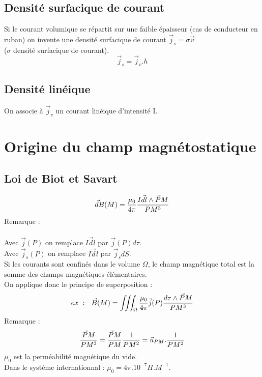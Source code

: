 \documentclass[11pt,a4paper,french]{article}
\begin{document}
\subsection{Densité surfacique de courant}
Si le courant volumique se répartit sur une faible épaisseur (cas de conducteur en ruban) on invente une densité surfacique de courant $\vec j_s = \sigma \vec v$ \\($\sigma$ densité surfacique de courant).
$$\vec j_s = \vec j_v .h$$
\subsection{Densité linéique}
On associe à $\vec j_v$ un courant linéique d'intensité I.
\newpage
\section{Origine du champ magnétostatique}
\subsection{Loi de Biot et Savart}
$$\vec dB(M) = {\mu_0 \over 4\pi}{I \vec dl \wedge \vec PM \over PM^3}$$
Remarque : \\ \\
Avec $\vec j(P)$ on remplace $I\vec dl$ par $\vec j(P)d\tau$.\\
Avec $\vec j_s(P)$ on remplace $I\vec dl$ par $\vec j_sdS$. \\
Si les courants sont confinés dans le volume $\Omega$, le champ magnétique total est la somme des champs magnétiques élémentaires.\\
On applique donc le principe de superposition : 
$$ex~:~~\vec B(M) = \iiint_\Omega {\mu_0 \over 4\pi}\vec j(P){d\tau \wedge \vec PM \over PM^3}$$
Remarque :
$${\vec PM \over PM^3} = {\vec PM \over PM}{1 \over PM^2} = \vec u_{PM}.{1 \over PM^2}$$
$\mu_0$ est la perméabilité magnétique du vide. \\
Dans le système internationnal : $\mu_0 = 4\pi.10^{-7} H.M^{-1}$.
\newpage
\end{document}
